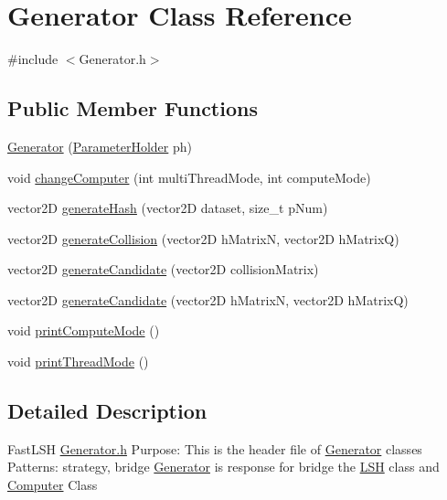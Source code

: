 \hypertarget{classGenerator}{}\section{Generator Class Reference}
\label{classGenerator}


{\ttfamily \#include $<$Generator.\+h$>$}

\subsection*{Public Member Functions}
\begin{DoxyCompactItemize}
\item 
\hyperlink{classGenerator_ab93ffd74e1323b76e50b70d2d1519090}{Generator} (\hyperlink{structParameterHolder}{Parameter\+Holder} ph)
\item 
void \hyperlink{classGenerator_afccd79299f07d1700ea3ad95dfeb2c58}{change\+Computer} (int multi\+Thread\+Mode, int compute\+Mode)
\item 
vector2D \hyperlink{classGenerator_ab43edfda8b3c4d3d99a28114f17ef402}{generate\+Hash} (vector2D dataset, size\+\_\+t p\+Num)
\item 
vector2D \hyperlink{classGenerator_ad24e3d29da62bf5c27dcde970aceac75}{generate\+Collision} (vector2D h\+MatrixN, vector2D h\+MatrixQ)
\item 
vector2D \hyperlink{classGenerator_a0497128242a481da9d2282f686db639a}{generate\+Candidate} (vector2D collision\+Matrix)
\item 
vector2D \hyperlink{classGenerator_adf524dcb1cae803d1fbc4604ef7f79e9}{generate\+Candidate} (vector2D h\+MatrixN, vector2D h\+MatrixQ)
\item 
void \hyperlink{classGenerator_a4f362d869aa8ce291c9d4b50d06bb99b}{print\+Compute\+Mode} ()
\item 
void \hyperlink{classGenerator_a487654ff9d10534f56dbe8f606b5f4d1}{print\+Thread\+Mode} ()
\end{DoxyCompactItemize}


\subsection{Detailed Description}
Fast\+L\+SH \hyperlink{Generator_8h_source}{Generator.\+h} Purpose\+: This is the header file of \hyperlink{classGenerator}{Generator} classes Patterns\+: strategy, bridge \hyperlink{classGenerator}{Generator} is response for bridge the \hyperlink{classLSH}{L\+SH} class and \hyperlink{classComputer}{Computer} Class

